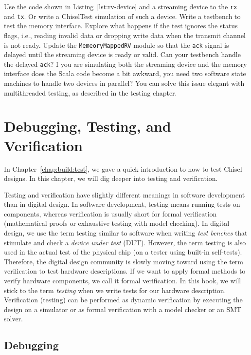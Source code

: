 \documentclass[%
    10pt,
    headinclude, footexclude,
    openright, %
    notitlepage,
    cleardoubleempty,
    headsepline,
    pointlessnumbers,
    bibtotoc, idxtotoc,
    ]{scrbook}
\newcommand{\code}[1]{{\lstinline[basicstyle=\small\ttfamily]{#1}}}
\begin{document}
Use the code shown in Listing~\ref{lst:rv-device} and a streaming device to the \code{rx}
and \code{tx}. Or write a ChiselTest simulation of such a device. Write a testbench
to test the memory interface. Explore what happens if the test ignores the status flags,
i.e., reading invalid data or dropping write data when the transmit channel is not ready.
Update the \code{MemeoryMappedRV} module so that the \code{ack} signal is delayed until
the streaming device is ready or valid. Can your testbench handle the delayed \code{ack}?
I you are simulating both the streaming device and the memory interface does the Scala
code become a bit awkward, you need two software state machines to handle
two devices in parallel? You can solve this issue elegant with multithreaded testing,
as described in the testing chapter.

\chapter{Debugging, Testing, and Verification}
\label{chap:testing}



In Chapter~\ref{chap:build:test}, we gave a quick introduction to how to test
Chisel designs. In this chapter, we will dig deeper into testing and
verification.

Testing and verification have slightly different meanings in software development
than in digital design. In software development, testing means running tests on components,
whereas verification is usually short for formal verification (mathematical proofs or exhaustive testing
with model checking). In digital design, we use the term testing similar to software when writing
\emph{test benches} that stimulate and check a \emph{device under test} (DUT). However, the term testing
is also used in the actual test of the physical chip (on a tester using built-in self-tests).
Therefore, the digital design community is slowly moving toward using the term verification to
test hardware descriptions. If we want to apply formal methods to verify hardware
components, we call it formal verification.
In this book, we will stick to the term \emph{testing} when we write tests for our hardware description.
Verification (testing) can be performed as dynamic verification by executing the design on a simulator or as formal verification with a model checker or an SMT solver.

\section{Debugging}
\end{document}
